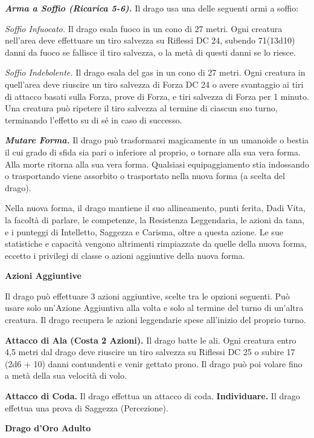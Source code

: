 \begin{multicols}{2}
\emph{\textbf{Arma a Soffio (Ricarica 5-6).}} Il drago usa una delle
seguenti armi a soffio:

\emph{Soffio Infuocato.} Il drago esala fuoco in un cono di 27 metri.
Ogni creatura nell'area deve effettuare un tiro salvezza su Riflessi DC
24, subendo 71(13d10) danni da fuoco se fallisce il tiro salvezza, o la
metà di questi danni se lo riesce.

\emph{Soffio Indebolente.} Il drago esala del gas in un cono di 27
metri. Ogni creatura in quell'area deve riuscire un tiro salvezza di Forza DC 24 o avere svantaggio ai tiri di attacco basati sulla Forza,
prove di Forza, e tiri salvezza di Forza per 1 minuto. Una creatura può
ripetere il tiro salvezza al termine di ciascun suo turno, terminando
l'effetto su di sé in caso di successo.

\emph{\textbf{Mutare Forma.}} Il drago può trasformarsi magicamente in
un umanoide o bestia il cui grado di sfida sia pari o inferiore al
proprio, o tornare alla sua vera forma. Alla morte ritorna alla sua vera
forma. Qualsiasi equipaggiamento stia indossando o trasportando viene
assorbito o trasportato nella nuova forma (a scelta del drago).

Nella nuova forma, il drago mantiene il suo allineamento, punti ferita,
Dadi Vita, la facoltà di parlare, le competenze, la Resistenza
Leggendaria, le azioni da tana, e i punteggi di Intelletto, Saggezza e
Carisma, oltre a questa azione. Le sue statistiche e capacità vengono
altrimenti rimpiazzate da quelle della nuova forma, eccetto i privilegi
di classe o azioni aggiuntive della nuova forma.

\textbf{Azioni Aggiuntive}

Il drago può effettuare 3 azioni aggiuntive, scelte tra le opzioni
seguenti. Può usare solo un'Azione Aggiuntiva alla volta e solo al
termine del turno di un'altra creatura. Il drago recupera le azioni
leggendarie spese all'inizio del proprio turno.

\textbf{Attacco di Ala (Costa 2 Azioni).} Il drago batte le ali. Ogni
creatura entro 4,5 metri dal drago deve riuscire un tiro salvezza su Riflessi DC 25 o subire 17 (2d6 + 10) danni contundenti e venir gettato
prono. Il drago può poi volare fino a metà della sua velocità di volo.

\textbf{Attacco di Coda.} Il drago effettua un attacco di coda.
\textbf{Individuare.} Il drago effettua una prova di Saggezza
(Percezione).



\textbf{Drago d'Oro Adulto}


\end{multicols}
